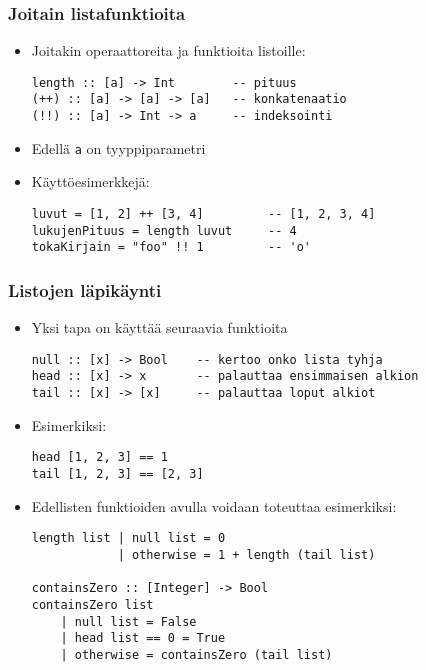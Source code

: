 \documentclass{beamer}
\begin{document}
\begin{frame}[fragile]
\frametitle{Joitain listafunktioita}

\begin{itemize}

\item{Joitakin operaattoreita ja funktioita listoille:}
\begin{verbatim}
length :: [a] -> Int        -- pituus
(++) :: [a] -> [a] -> [a]   -- konkatenaatio
(!!) :: [a] -> Int -> a     -- indeksointi
\end{verbatim}

\item{Edellä \texttt{a} on tyyppiparametri}

\item{Käyttöesimerkkejä:}
\begin{verbatim}
luvut = [1, 2] ++ [3, 4]         -- [1, 2, 3, 4]
lukujenPituus = length luvut     -- 4
tokaKirjain = "foo" !! 1         -- 'o'
\end{verbatim}

\end{itemize}

\end{frame}

\begin{frame}[fragile]
\frametitle{Listojen läpikäynti}

\begin{itemize}
\item{Yksi tapa on käyttää seuraavia funktioita}
\begin{verbatim}
null :: [x] -> Bool    -- kertoo onko lista tyhja
head :: [x] -> x       -- palauttaa ensimmaisen alkion
tail :: [x] -> [x]     -- palauttaa loput alkiot
\end{verbatim}

\item{Esimerkiksi:}
\begin{verbatim}
head [1, 2, 3] == 1
tail [1, 2, 3] == [2, 3]
\end{verbatim}

\item{Edellisten funktioiden avulla voidaan toteuttaa esimerkiksi:}
\begin{verbatim}
length list | null list = 0
            | otherwise = 1 + length (tail list)

containsZero :: [Integer] -> Bool
containsZero list
    | null list = False
    | head list == 0 = True
    | otherwise = containsZero (tail list)
\end{verbatim}
\end{itemize}

\end{frame}
\end{document}
